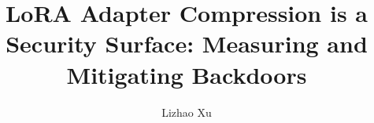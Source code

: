 \documentclass[11pt]{article}
\title{LoRA Adapter Compression is a Security Surface: Measuring and Mitigating Backdoors}
\author{Lizhao Xu}
\date{}
\begin{document}
\maketitle












\clearpage
\onecolumn
\appendix


\clearpage


\end{document}

